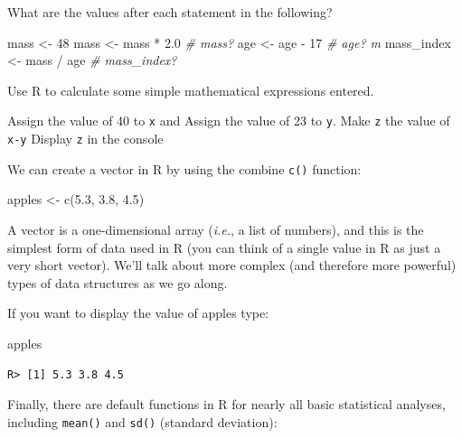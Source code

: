 \documentclass[
]{book}
\newenvironment{Shaded}{\begin{snugshade}}{\end{snugshade}}
\newcommand{\CommentTok}[1]{\textcolor[rgb]{0.56,0.35,0.01}{\textit{#1}}}
\newcommand{\DecValTok}[1]{\textcolor[rgb]{0.00,0.00,0.81}{#1}}
\newcommand{\FloatTok}[1]{\textcolor[rgb]{0.00,0.00,0.81}{#1}}
\newcommand{\FunctionTok}[1]{\textcolor[rgb]{0.00,0.00,0.00}{#1}}
\newcommand{\NormalTok}[1]{#1}
\newcommand{\OtherTok}[1]{\textcolor[rgb]{0.56,0.35,0.01}{#1}}
\newcommand{\SpecialCharTok}[1]{\textcolor[rgb]{0.00,0.00,0.00}{#1}}
\begin{document}
What are the values after each statement in the following?

\begin{Shaded}
\begin{Highlighting}[]
\NormalTok{mass }\OtherTok{\textless{}{-}} \DecValTok{48} 
\NormalTok{mass }\OtherTok{\textless{}{-}}\NormalTok{ mass }\SpecialCharTok{*} \FloatTok{2.0} \CommentTok{\# mass? }
\NormalTok{age }\OtherTok{\textless{}{-}}\NormalTok{ age }\SpecialCharTok{{-}} \DecValTok{17} \CommentTok{\# age? m}
\NormalTok{mass\_index }\OtherTok{\textless{}{-}}\NormalTok{ mass }\SpecialCharTok{/}\NormalTok{ age }\CommentTok{\# mass\_index?}
\end{Highlighting}
\end{Shaded}

Use R to calculate some simple mathematical expressions entered.

Assign the value of 40 to \texttt{x} and Assign the value of 23 to \texttt{y}. Make \texttt{z} the value of \texttt{x-y} Display \texttt{z} in the console

We can create a vector in R by using the combine \texttt{c()} function:

\begin{Shaded}
\begin{Highlighting}[]
\NormalTok{apples }\OtherTok{\textless{}{-}} \FunctionTok{c}\NormalTok{(}\FloatTok{5.3}\NormalTok{, }\FloatTok{3.8}\NormalTok{, }\FloatTok{4.5}\NormalTok{)}
\end{Highlighting}
\end{Shaded}

A vector is a one-dimensional array (\emph{i.e.}, a list of numbers), and this is the simplest form of data used in R (you can think of a single value in R as just a very short vector). We'll talk about more complex (and therefore more powerful) types of data structures as we go along.

If you want to display the value of apples type:

\begin{Shaded}
\begin{Highlighting}[]
\NormalTok{apples}
\end{Highlighting}
\end{Shaded}

\begin{verbatim}
R> [1] 5.3 3.8 4.5
\end{verbatim}

Finally, there are default functions in R for nearly all basic statistical analyses, including \texttt{mean()} and \texttt{sd()} (standard deviation):
\end{document}

